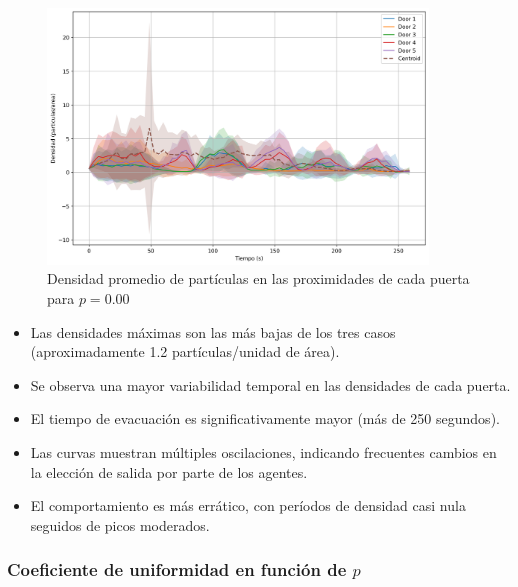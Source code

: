 \documentclass[12pt]{article}
\begin{document}
\begin{figure}[H]
    \centering
    \includegraphics[width=0.9\textwidth]{img/circular_density_t_20_&_p_0.00.png}
    \caption{Densidad promedio de partículas en las proximidades de cada puerta para $p=0.00$}
    \label{fig:densidad_p000}
\end{figure}

\begin{itemize}
    \item Las densidades máximas son las más bajas de los tres casos (aproximadamente 1.2 partículas/unidad de área).
    \item Se observa una mayor variabilidad temporal en las densidades de cada puerta.
    \item El tiempo de evacuación es significativamente mayor (más de 250 segundos).
    \item Las curvas muestran múltiples oscilaciones, indicando frecuentes cambios en la elección de salida por parte de los agentes.
    \item El comportamiento es más errático, con períodos de densidad casi nula seguidos de picos moderados.
\end{itemize}

\subsubsection{Coeficiente de uniformidad en función de $p$}
\end{document}

